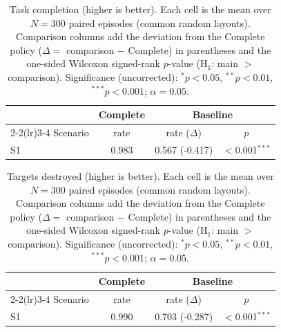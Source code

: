 
\begin{table}[ht]
  \centering
  \caption{Task completion (higher is better). Each cell is the mean over $N=300$ paired episodes (common random layouts). Comparison columns add the deviation from the Complete policy ($\Delta=$ comparison $-$ Complete) in parentheses and the one-sided Wilcoxon signed-rank $p$-value (H$_1$: main $>$ comparison). Significance (uncorrected): $^{*}p<0.05$, $^{**}p<0.01$, $^{***}p<0.001$; $\alpha=0.05$.}
  \label{tab:wilcoxon-completion}
  \small
  \begin{tabular}{l c cc}
    \toprule
     & Complete & \multicolumn{2}{c}{Baseline} \\
    \cmidrule(lr){2-2}\cmidrule(lr){3-4}
    Scenario & {rate} & {rate ($\Delta$)} & {$p$} \\
    \midrule
    S1 & 0.983 & 0.567 (-0.417) & $<$0.001$^{***}$ \\
    \bottomrule
  \end{tabular}
\end{table}

\begin{table}[ht]
  \centering
  \caption{Targets destroyed (higher is better). Each cell is the mean over $N=300$ paired episodes (common random layouts). Comparison columns add the deviation from the Complete policy ($\Delta=$ comparison $-$ Complete) in parentheses and the one-sided Wilcoxon signed-rank $p$-value (H$_1$: main $>$ comparison). Significance (uncorrected): $^{*}p<0.05$, $^{**}p<0.01$, $^{***}p<0.001$; $\alpha=0.05$.}
  \label{tab:wilcoxon-targets}
  \small
  \begin{tabular}{l c cc}
    \toprule
     & Complete & \multicolumn{2}{c}{Baseline} \\
    \cmidrule(lr){2-2}\cmidrule(lr){3-4}
    Scenario & {rate} & {rate ($\Delta$)} & {$p$} \\
    \midrule
    S1 & 0.990 & 0.703 (-0.287) & $<$0.001$^{***}$ \\
    \bottomrule
  \end{tabular}
\end{table}

